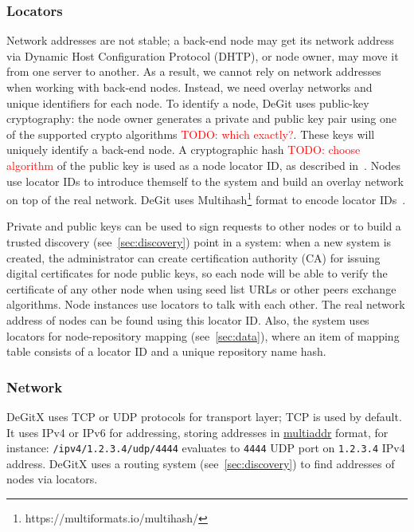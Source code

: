\documentclass[acmlarge, screen, nonacm, 11pt]{acmart}
\newcommand{\code}[1]{\texttt{#1}}
\newcommand{\todo}[1]{\textcolor{red}{TODO: #1}}
\begin{document}
\subsubsection{Locators}\label{sec:locators}
Network addresses are not stable; a back-end node may get its network address via
Dynamic Host Configuration Protocol (DHTP), or node owner, may move it from one server to another.
As a result, we cannot rely on network addresses when working with back-end nodes. Instead, we need
overlay networks and unique identifiers for each node. To identify a node, DeGit uses
public-key cryptography: the node owner generates a private and public key pair using one of the supported
crypto algorithms \todo{which exactly?}. These keys will uniquely identify a back-end node.
A cryptographic hash \todo{choose algorithm} of the public key is used as a node locator ID,
as described in~\cite{S_Kademlia_Secure_Key-Based_Routing}.
Nodes use locator IDs to introduce
themself to the system and build an overlay network on top of the real network. DeGit uses
Multihash\footnote{https://multiformats.io/multihash/} format to encode locator IDs~\cite{IPFS_research}.

Private and public keys can be used to sign requests to other nodes or to build a
trusted discovery (see~\ref{sec:discovery}) point in a system: when a new system is created,
the administrator can create certification authority (CA) for issuing digital certificates for node
public keys, so each node will be able to verify the certificate of any other node when
using seed list URLs or other peers exchange algorithms. Node instances use locators to talk
with each other. The real network address of nodes can be found using this locator ID.
Also, the system uses locators for node-repository mapping (see~\ref{sec:data}), where an
item of mapping table consists of a locator ID and a unique repository name hash.

\subsubsection{Network}\label{sec:network}

DeGitX uses TCP or UDP protocols for transport layer; TCP is used by default. It uses IPv4 or IPv6 for addressing,
storing addresses in \href{https://github.com/multiformats/multiaddr}{multiaddr} format, for instance:
\code{/ipv4/1.2.3.4/udp/4444} evaluates to \code{4444} UDP port on \code{1.2.3.4} IPv4 address.
DeGitX uses a routing system (see~\ref{sec:discovery}) to find addresses of nodes via locators.
\end{document}
